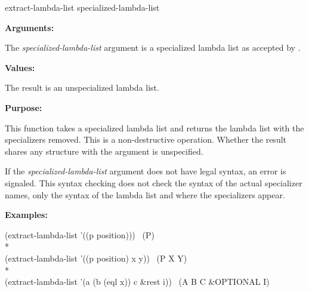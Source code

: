 \begin{defun}[Function]
extract-lambda-list specialized-lambda-list

\textbf{Arguments:}

The \emph{specialized-lambda-list} argument is a specialized lambda list as
accepted by .

\textbf{Values:}

The result is an unspecialized lambda list.

\textbf{Purpose:}

This function takes a specialized lambda list and returns the lambda list with
the specializers removed. This is a non-destructive operation. Whether the
result shares any structure with the argument is unspecified.

If the \emph{specialized-lambda-list} argument does not have legal syntax, an error is
signaled. This syntax checking does not check the syntax of the actual
specializer names, only the syntax of the lambda list and where the specializers
appear.

\textbf{Examples:}

\begin{lisp}
(extract-lambda-list '((p position))) \EQ\ (P)\\*
\\
(extract-lambda-list '((p position) x y)) \EQ\ (P X Y)\\*
\\
(extract-lambda-list '(a (b (eql x)) c \&rest i)) \EQ\ (A B C \&OPTIONAL I)
\end{lisp}
\end{defun}

